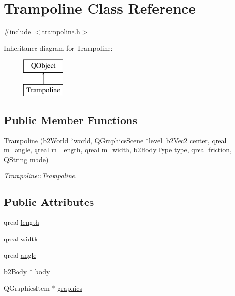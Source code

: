 \hypertarget{class_trampoline}{}\section{Trampoline Class Reference}
\label{class_trampoline}


{\ttfamily \#include $<$trampoline.\+h$>$}

Inheritance diagram for Trampoline\+:\begin{figure}[H]
\begin{center}
\leavevmode
\includegraphics[height=2.000000cm]{class_trampoline}
\end{center}
\end{figure}
\subsection*{Public Member Functions}
\begin{DoxyCompactItemize}
\item 
\hyperlink{class_trampoline_a7f77638c6896a68464545bf3373df32b}{Trampoline} (b2\+World $\ast$world, Q\+Graphics\+Scene $\ast$level, b2\+Vec2 center, qreal m\+\_\+angle, qreal m\+\_\+length, qreal m\+\_\+width, b2\+Body\+Type type, qreal friction, Q\+String mode)
\begin{DoxyCompactList}\small\item\em \hyperlink{class_trampoline_a7f77638c6896a68464545bf3373df32b}{Trampoline\+::\+Trampoline}. \end{DoxyCompactList}\end{DoxyCompactItemize}
\subsection*{Public Attributes}
\begin{DoxyCompactItemize}
\item 
qreal \hyperlink{class_trampoline_afc20b8e85af09d551c0278b2dcc1d35d}{length}
\item 
qreal \hyperlink{class_trampoline_abc6d02536d9caeb1c1d80c545ebae044}{width}
\item 
qreal \hyperlink{class_trampoline_ae2b2f0ba18c591bbcf360f368758edf7}{angle}
\item 
b2\+Body $\ast$ \hyperlink{class_trampoline_a5640097c2fa1b82b69338e3e3d5fc18e}{body}
\item 
Q\+Graphics\+Item $\ast$ \hyperlink{class_trampoline_a889e4c0143c14b47dc7575395356560a}{graphics}
\end{DoxyCompactItemize}


